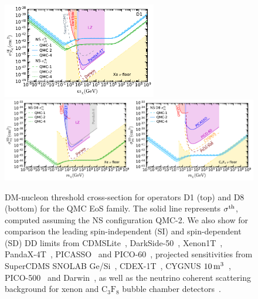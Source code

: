 \begin{figure}[t!bp]
   \centering 
\includegraphics[width=0.6\textwidth]{capture_3/sigmath_mdm_SI_meff.pdf}
\includegraphics[width=\textwidth]{capture_3/sigmath_mdm_SD_meff.pdf}
   \caption{ DM-nucleon threshold cross-section for operators D1 (top) and D8 (bottom) for the QMC EoS family. The solid line represents $\sigma^{\rm th}$, computed assuming the NS configuration QMC-2. 
   We also show for comparison the leading spin-independent (SI) and spin-dependent (SD) DD limits from CDMSLite~\cite{SuperCDMS:2017nns_Lowmassdarkmatter}, DarkSide-50~\cite{DarkSide:2018bpj_Lowmassdarkmatter},  Xenon1T~\cite{XENON:2019rxp_ConstrainingspindependentWIMPnucleon,XENON:2019gfn_Lightdarkmatter, XENON:2019zpr_Searchlightdark,XENON:2020gfr_mar_SearchCoherentElastic}, PandaX-4T~\cite{PandaX-4T:2021bab_dec_DarkMatterSearch}, PICASSO~\cite{Behnke:2016lsk_apr_FinalResultsPICASSO} and PICO-60~\cite{PICO:2019vsc_jul_Darkmattersearch},  projected sensitivities from SuperCDMS SNOLAB Ge/Si~\cite{SuperCDMS:2016wui_ProjectedsensitivitySuperCDMS}, CDEX-1T~\cite{Yue:2016epq_CDEXdarkmatter}, CYGNUS  $10{\rm \,m}^3$~\cite{Vahsen:2020pzb_aug_CYGNUSFeasibilitynuclear},  PICO-500~\cite{VazquezJauregui_PICO500LSimulations500L} and Darwin~\cite{DARWIN:2016hyl_DARWINultimatedark}, as well as the neutrino coherent scattering background for xenon and $\mathrm{C_3F_8}$ bubble chamber detectors~\cite{Ruppin:2014bra_oct_Complementaritydarkmatter}.  
   } 
   \label{ch5:fig:sigmath}
\end{figure}


